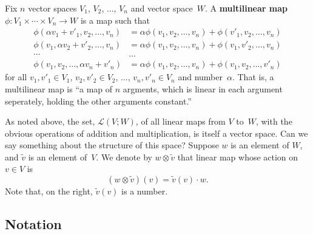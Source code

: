 \documentclass[10pt, a4paper, twocolumn]{article}
\newcommand{\defn}[1]{\textbf{#1}}
\begin{document}
Fix $n$ vector spaces $V_1$, $V_2$, ..., $V_n$ and vector space~$W$. A
\defn{multilinear map} $\phi:V_1\times\dotsb\times V_n \to W$ is a map such that
\begin{equation*}
  \begin{aligned}
  \phi(\alpha v_1 + v'_1, v_2, \dotsc, v_n) &= \alpha \phi(v_1, v_2, \dotsc, v_n) + \phi(v'_1, v_2,
  \dotsc, v_n) \\
  \phi(v_1, \alpha v_2 + v'_2, \dotsc, v_n) &= \alpha \phi(v_1, v_2, \dotsc, v_n) + \phi(v_1, v'_2,
  \dotsc, v_n) \\
  \dotsm &\dots \\
  \phi(v_1, v_2, \dotsc, \alpha v_n + v'_n) &= \alpha \phi(v_1, v_2, \dotsc, v_n) + \phi(v_1, v_2,
  \dotsc, v'_n)  
  \end{aligned}
  \end{equation*}
for all $v_1, v'_1\in V_1$, $v_2, v'_2 \in V_2$, ..., $v_n, v'_n \in V_n$ and
number~$\alpha$. That is, a multilinear map is “a map of $n$ argments, which is
linear in each argument seperately, holding the other arguments constant.”




As noted above, the set, $\mathcal{L}(V;W)$, of all linear maps from $V$ to~$W$,
with the obvious operations of addition and multiplication, is itself a vector
space. Can we say something about the structure of this space? Suppose $w$ is an
element of $W$, and $\tilde{v}$ is an element of~$V$. We denote by $w \otimes
\tilde{v}$ that linear map whose action on $v\in V$ is
\begin{equation*}
(w \otimes \tilde{v})(v) = \tilde{v}(v) \cdot w.
\end{equation*}
Note that, on the right, $\tilde{v}(v)$ is a number.









\subsection{Notation} 
\end{document}
